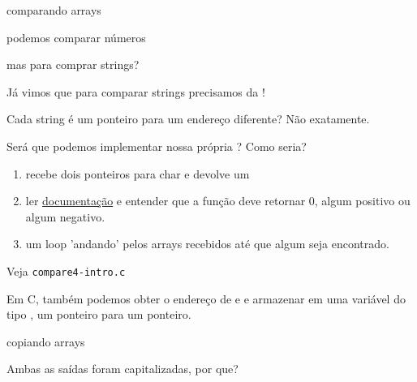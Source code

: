 \documentclass{beamer}
\begin{document}
\begin{frame}{comparando arrays}

  podemos comparar números

  

  mas para comprar strings?

  \framebreak

  

  Já vimos que para comparar strings precisamos da !

  \framebreak

  

  \framebreak

  Cada string é um ponteiro para um endereço diferente? Não exatamente.

  

  \framebreak

  Será que podemos implementar nossa própria ? Como
  seria?

  \begin{enumerate}
  \item recebe dois ponteiros para char e devolve um 
  \item ler
    \href{https://man7.org/linux/man-pages/man3/strcmp.3.html}{documentação}
    e entender que a função deve retornar 0, algum positivo ou algum
    negativo.
  \item um loop 'andando' pelos arrays recebidos até que algum
    \ilcode{\0} seja encontrado.
  \end{enumerate}

  Veja \texttt{compare4-intro.c}
  
  \framebreak
  
  Em C, também podemos obter o endereço de  e  e
  armazenar em uma variável do tipo , um ponteiro para
  um ponteiro.

\end{frame}


\begin{frame}{copiando arrays}  

  

  Ambas as saídas foram capitalizadas, por que?
  
\end{frame}  
\end{document}

